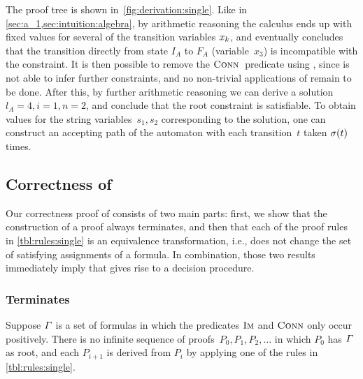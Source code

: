 The proof tree is shown in~\cref{fig:derivation:single}. Like in
\cref{sec:a_1,sec:intuition:algebra}, by arithmetic reasoning the
calculus ends up with fixed values for several of the transition
variables $x_k$, and eventually concludes that the
transition directly from state $I_{A}$ to $F_{A}$ (variable~$x_3$)
is incompatible with
the constraint.  It is then possible to remove the $\operatorname{\textsc{Conn}}{}$
predicate using \Subsume{}, since \Propagate{} is not able to infer
further constraints, and no non-trivial applications of \Split{}
remain to be done.  After this, by further arithmetic reasoning we can
derive a solution~$l_A = 4, i = 1, n = 2$, and conclude that the root
constraint is satisfiable.  To obtain values for the string
variables~$s_1, s_2$ corresponding to the solution, one can
construct an accepting path of the automaton with each transition~$t$
taken $\operatorname{\sigma}(t)$ times.

\iffalse

the rest of the reasoning can be
continued without any part of \Calculus{} since all values of the
existentially quantified transition variables
$\TransitionVar_1,\ldots,\TransitionVar_5$ compatible with
\cref{const:more-inside-than-before,const:s1-in-c-dd,const:s1-substring,const:something-before-and-after}
are represented by the flow equations introduced by $\Expand{}$.
\fi

\subsection{Correctness of \Calculus{}}\label{sec:single:correct}

Our correctness proof of \Calculus{} consists of two main parts: first, we show
that the construction of a proof always terminates, and then that each of the
proof rules in \cref{tbl:rules:single} is an equivalence transformation, i.e.,
does not change the set of satisfying assignments of a formula. In combination,
those two results immediately imply that \Calculus{} gives rise to a decision
procedure.

\subsubsection{\Calculus{} Terminates}
\begin{lemma}\label{lma:single-terminates}
  Suppose $\varGamma{}$ is a set of formulas in which the predicates
  $\operatorname{\textsc{Im}}$ and $\operatorname{\textsc{Conn}}$ only occur positively. There is no
  infinite sequence of proofs~$P_0, P_1, P_2, \ldots$ in which $P_0$
  has $\varGamma{}$ as root, and each $P_{i+1}$ is derived from
  $P_i$ by applying one of the rules in \cref{tbl:rules:single}.
\end{lemma}

